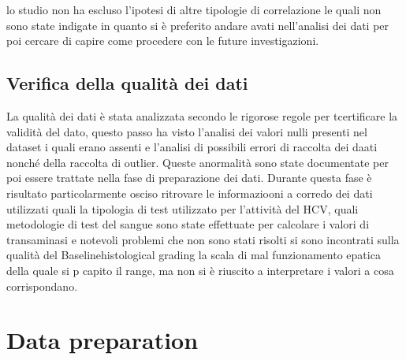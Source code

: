 \documentclass[italian,12pt,a4paper]{article}
\begin{document}
    lo studio non ha escluso l'ipotesi di altre tipologie di correlazione le quali non sono state indigate in quanto si è preferito andare avati nell'analisi dei dati per poi cercare di capire come procedere con le future investigazioni.
    
    \vspace{25pt}
	
	
	\subsection{Verifica della qualità dei dati}
    La qualità dei dati è stata analizzata secondo le rigorose regole per tcertificare la validità del dato, questo passo ha visto l'analisi dei valori nulli presenti nel dataset i quali erano assenti e l'analisi di possibili errori di raccolta dei daati nonché della raccolta di outlier. Queste anormalità sono state documentate per poi essere trattate nella fase di preparazione dei dati. Durante questa fase è risultato particolarmente osciso ritrovare le informaziooni a corredo dei dati utilizzati quali la tipologia di test utilizzato per l'attività del HCV, quali metodologie di test del sangue sono state effettuate per calcolare i valori di transaminasi e notevoli problemi che non sono stati risolti si sono incontrati sulla qualità del Baselinehistological grading la scala di mal funzionamento epatica della quale si p capito il range, ma non si è riuscito a interpretare i valori a cosa corrispondano.

    \section{Data preparation}
\end{document}
